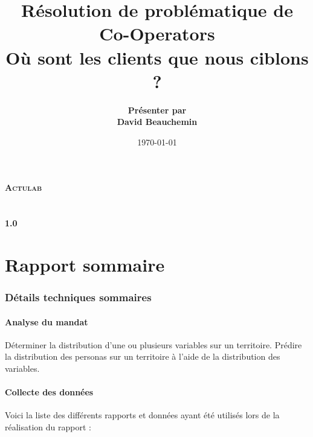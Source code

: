 \documentclass[11pt,french]{article}\usepackage[]{graphicx}\usepackage[]{color}
\title{Résolution de problématique de \\ Co-Operators \\ \bigskip Où sont les clients que nous ciblons ?}
\author{\textbf{Présenter par \\ David Beauchemin}}
\date{\today}
\def\versionnumber{1.0}
\begin{document}
\makeatletter
  \begin{titlepage}
  \centering
      {\LARGE \textbf{\textsc{Actulab}}}\\
    \vspace{2cm}
    \vspace{2cm}
      {\LARGE \textbf{\@title}} \\
    \vspace{2cm}
    \vfill
       {\Large \@author} \\
    \vspace{8cm}
        {\large\textbf{\versionnumber}}\\
    \vfill
  \end{titlepage}
\makeatother


\pagebreak

\tableofcontents

\newpage

\part{Rapport sommaire}

\section{Détails techniques sommaires}

\subsection{Analyse du mandat}

Déterminer la distribution d'une ou plusieurs variables sur un territoire. Prédire la distribution des personas sur un territoire à l'aide de la distribution des variables.

\subsection{Collecte des données}

Voici la liste des différents rapports et données ayant été utilisés lors de la réalisation du rapport :
\end{document}
